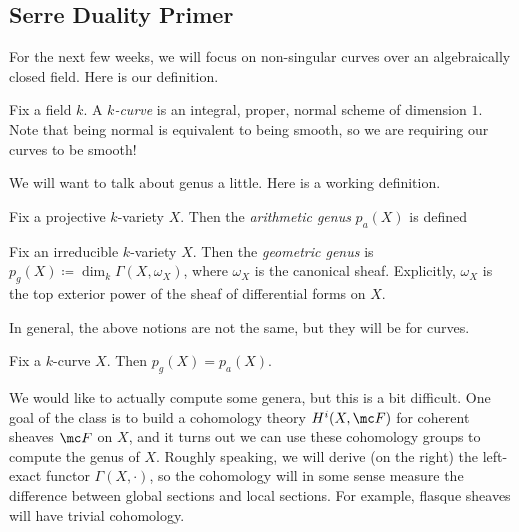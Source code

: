 \documentclass[../notes.tex]{subfiles}
\begin{document}
\subsection{Serre Duality Primer}
For the next few weeks, we will focus on non-singular curves over an algebraically closed field. Here is our definition.
\begin{definition}[curve]
	Fix a field $k$. A \textit{$k$-curve} is an integral, proper, normal scheme of dimension $1$. Note that being normal is equivalent to being smooth, so we are requiring our curves to be smooth!
\end{definition}
We will want to talk about genus a little. Here is a working definition.
\begin{definition}
	Fix a projective $k$-variety $X$. Then the \textit{arithmetic genus} $p_a(X)$ is defined
\end{definition}
\begin{definition}
	Fix an irreducible $k$-variety $X$. Then the \textit{geometric genus} is $p_g(X)\coloneqq\dim_k\Gamma(X,\omega_X)$, where $\omega_X$ is the canonical sheaf. Explicitly, $\omega_X$ is the top exterior power of the sheaf of differential forms on $X$.
\end{definition}
In general, the above notions are not the same, but they will be for curves.
\begin{proposition}
	Fix a $k$-curve $X$. Then $p_g(X)=p_a(X)$.
\end{proposition}
We would like to actually compute some genera, but this is a bit difficult. One goal of the class is to build a cohomology theory $H^i(X,\mc F)$ for coherent sheaves $\mc F$ on $X$, and it turns out we can use these cohomology groups to compute the genus of $X$. Roughly speaking, we will derive (on the right) the left-exact functor $\Gamma(X,\cdot)$, so the cohomology will in some sense measure the difference between global sections and local sections. For example, flasque sheaves will have trivial cohomology.
\end{document}
